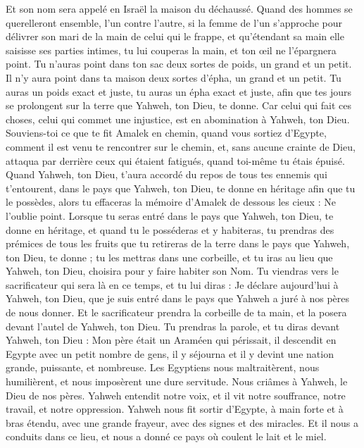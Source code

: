 \begin{multicols}{2}
Et son nom sera appelé en Israël la maison du déchaussé.
Quand des hommes se querelleront ensemble, l'un contre l'autre, si la femme de l'un s'approche pour délivrer son mari de la main de celui qui le frappe, et qu'étendant sa main elle saisisse ses parties intimes,
tu lui couperas la main, et ton œil ne l'épargnera point.
Tu n'auras point dans ton sac deux sortes de poids, un grand et un petit.
Il n'y aura point dans ta maison deux sortes d'épha, un grand et un petit.
Tu auras un poids exact et juste, tu auras un épha exact et juste, afin que tes jours se prolongent sur la terre que Yahweh, ton Dieu, te donne.
Car celui qui fait ces choses, celui qui commet une injustice, est en abomination à Yahweh, ton Dieu.
Souviens-toi ce que te fit Amalek en chemin, quand vous sortiez d'Egypte,
comment il est venu te rencontrer sur le chemin, et, sans aucune crainte de Dieu, attaqua par derrière ceux qui étaient fatigués, quand toi-même tu étais épuisé.
Quand Yahweh, ton Dieu, t'aura accordé du repos de tous tes ennemis qui t’entourent, dans le pays que Yahweh, ton Dieu, te donne en héritage afin que tu le possèdes, alors tu effaceras la mémoire d'Amalek de dessous les cieux : Ne l'oublie point.
\VerseOne{}Lorsque tu seras entré dans le pays que Yahweh, ton Dieu, te donne en héritage, et quand tu le posséderas et y habiteras,
tu prendras des prémices de tous les fruits que tu retireras de la terre dans le pays que Yahweh, ton Dieu, te donne ; tu les mettras dans une corbeille, et tu iras au lieu que Yahweh, ton Dieu, choisira pour y faire habiter son Nom.
Tu viendras vers le sacrificateur qui sera là en ce temps, et tu lui diras : Je déclare aujourd'hui à Yahweh, ton Dieu, que je suis entré dans le pays que Yahweh a juré à nos pères de nous donner.
Et le sacrificateur prendra la corbeille de ta main, et la posera devant l'autel de Yahweh, ton Dieu.
Tu prendras la parole, et tu diras devant Yahweh, ton Dieu : Mon père était un Araméen qui périssait, il descendit en Egypte avec un petit nombre de gens, il y séjourna et il y devint une nation grande, puissante, et nombreuse.
Les Egyptiens nous maltraitèrent, nous humilièrent, et nous imposèrent une dure servitude.
Nous criâmes à Yahweh, le Dieu de nos pères. Yahweh entendit notre voix, et il vit notre souffrance, notre travail, et notre oppression.
Yahweh nous fit sortir d'Egypte, à main forte et à bras étendu, avec une grande frayeur, avec des signes et des miracles.
Et il nous a conduits dans ce lieu, et nous a donné ce pays où coulent le lait et le miel.

\end{multicols}
